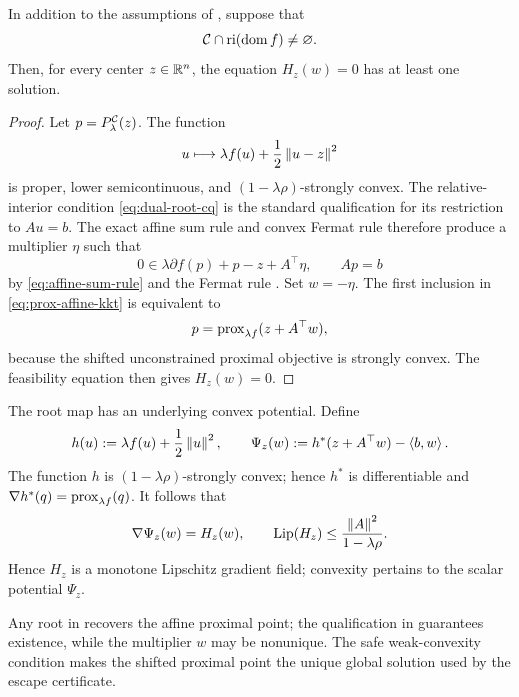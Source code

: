 \begin{proposition}
  \label{prop:dual-root-existence}
  In addition to the assumptions of , suppose that
  \begin{equation}
    \mathcal{C}\cap\operatorname{ri}(\operatorname{dom}f)\ne\varnothing.
    \label{eq:dual-root-cq}
  \end{equation}
  Then, for every center \(z\in\mathbb{R}^n\), the equation \(H_z(w)=0\) has at
  least one solution.
\end{proposition}

\begin{proof}
  Let \(p=P_\lambda^{\mathcal{C}}(z)\).  The function
  \[
    u\longmapsto
    \lambda f(u)+\frac12\left\lVert u-z\right\rVert^{2}
  \]
  is proper, lower semicontinuous, and
  \((1-\lambda\rho)\)-strongly convex.  The relative-interior condition
  \eqref{eq:dual-root-cq} is the standard qualification for its restriction
  to \(Au=b\).  The exact affine sum rule and convex Fermat rule therefore
  produce a multiplier \(\eta\) such that
  \begin{equation}
    0
    \in
    \lambda\partial f(p)+p-z+A^\top\eta,
    \qquad
    Ap=b
    \label{eq:prox-affine-kkt}
  \end{equation}
  by \cref{eq:affine-sum-rule} and the Fermat rule
  \citep[Theorem~10.1]{RockafellarWets1998}.  Set
  \(w=-\eta\).  The first inclusion in \cref{eq:prox-affine-kkt} is
  equivalent to
  \[
    p=\operatorname{prox}_{\lambda f}(z+A^\top w),
  \]
  because the shifted unconstrained proximal objective is strongly convex.
  The feasibility equation then gives \(H_z(w)=0\).
\end{proof}

The root map has an underlying convex potential.  Define
\[
  h(u):=\lambda f(u)+\frac12\left\lVert u\right\rVert^{2},
  \qquad
  \Psi_z(w):=h^*(z+A^\top w)-\left\langle b,w\right\rangle.
\]
The function \(h\) is \((1-\lambda\rho)\)-strongly convex; hence \(h^*\) is
differentiable and
\(\nabla h^*(q)=\operatorname{prox}_{\lambda f}(q)\).  It follows that
\begin{equation}
  \nabla\Psi_z(w)=H_z(w),
  \qquad
  \operatorname{Lip}(H_z)
  \le\frac{\left\lVert A\right\rVert^{2}}{1-\lambda\rho}.
  \label{eq:dual-potential}
\end{equation}
Hence \(H_z\) is a monotone Lipschitz gradient field; convexity pertains to the
scalar potential \(\Psi_z\).

Any root in  recovers the affine proximal point; the
qualification in  guarantees existence, while
the multiplier \(w\) may be nonunique.  The safe weak-convexity condition
makes the shifted proximal point the unique global solution used by the
escape certificate.

